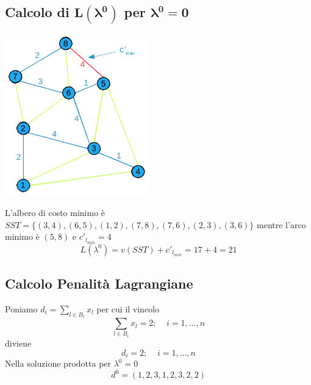 \subsection{Calcolo di $\boldsymbol{L(\lambda^{0})}$ per $\boldsymbol{\lambda^{0}=0}$}
\centerline{\includegraphics[height=7cm]{images/graph31.png}}
L'albero di costo minimo è $SST=\{(3,4),(6,5),(1,2),(7,8),(7,6),(2,3),(3,6)\}$ mentre l'arco minimo è $(5,8)$ e $c'_{l_{min}}=4$
\begin{equation}
	L(\lambda^{0})=v(SST)+c'_{l_{min}}=17+4=21
\end{equation}

\subsection{Calcolo Penalità Lagrangiane}
Poniamo $d_{i}=\sum_{l\in B_{i}}x_{l}$ per cui il vincolo
\begin{equation}
	\sum_{l\in B_{i}}x_{l}=2;\;\;\;\;i=1,\dots,n
\end{equation}
diviene
\begin{equation}
	d_{i}=2;\;\;\;\;i=1,\dots,n
\end{equation}
Nella soluzione prodotta per $\lambda^{0}=0$
\begin{equation}
	d^{0}=(1,2,3,1,2,3,2,2)
\end{equation}

\centerline{}

